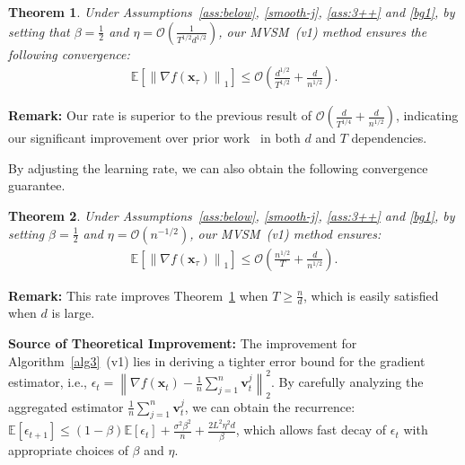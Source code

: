 \documentclass{article}
\newcommand{\E}{\mathbb{E}}
\newtheorem{theorem}{Theorem}[section]
\newcommand{\Norm}[1]{\left\|#1\right\|}
\def \E {\mathbb{E}}
\def \v {\mathbf{v}}
\def \x {\mathbf{x}}
\def \E {\mathbb{E}}
\def \x {\mathbf{x}}
\def \v {\mathbf{v}}
\begin{document}
\begin{theorem}\label{thm3} 
Under Assumptions~\ref{ass:below}, \ref{smooth-j}, \ref{ass:3++} and \ref{bg1}, by setting that $\beta=\frac{1}{2}$ and $\eta = \mathcal{O}\left( \frac{1}{T^{1/2}d^{1/2}}\right)$, our MVSM~(v1) method ensures the following convergence:
\begin{align*}
    \E \left[\Norm{\nabla f(\x_\tau)}_1 \right]\leq \mathcal{O}\left( \frac{d^{1/2}}{T^{1/2}} + \frac{d}{n^{1/2}} \right) .
\end{align*}
\end{theorem}
\textbf{Remark:} Our rate is superior to the previous result of $\mathcal{O}\left( \frac{d}{T^{1/4}} + \frac{d}{n^{1/2}} \right)$, indicating our significant improvement over prior work~\citep{pmlr-v202-sun23l} in both $d$ and $T$ dependencies.

By adjusting the learning rate, we can also obtain the following convergence guarantee.
\begin{theorem}\label{thm3+} Under Assumptions~\ref{ass:below}, \ref{smooth-j}, \ref{ass:3++} and \ref{bg1}, by setting $\beta=\frac{1}{2}$ and $\eta = \mathcal{O}( {n^{-1/2}})$, our MVSM~(v1) method ensures:
\begin{align*}
    \E \left[\Norm{\nabla f(\x_\tau)}_1 \right]\leq \mathcal{O}\left( \frac{n^{1/2}}{T} + \frac{d}{n^{1/2}} \right) .
\end{align*}
\end{theorem}
\textbf{Remark:} This rate improves Theorem~\ref{thm3} when $T \geq \frac{n}{d}$, which is easily satisfied when $d$ is large.

\noindent\textbf{Source of Theoretical Improvement:} The improvement for Algorithm~\ref{alg3}~(v1) lies in deriving a tighter error bound for the gradient estimator, i.e., $\epsilon_t = \Norm{ \nabla f(\x_t) - \frac{1}{n} \sum_{j=1}^n \v_t^j}_2^2$. By carefully analyzing the aggregated estimator $\frac{1}{n} \sum_{j=1}^n \v_t^j$, we can obtain the  recurrence: $\E[\epsilon_{t+1}] \le (1-\beta)\E[\epsilon_t]+\frac{\sigma^2\beta^2}{n}+\frac{2L^2\eta^2d}{\beta}$, which allows fast decay of $\epsilon_t$ with appropriate choices of $\beta$ and $\eta$.
\end{document}
